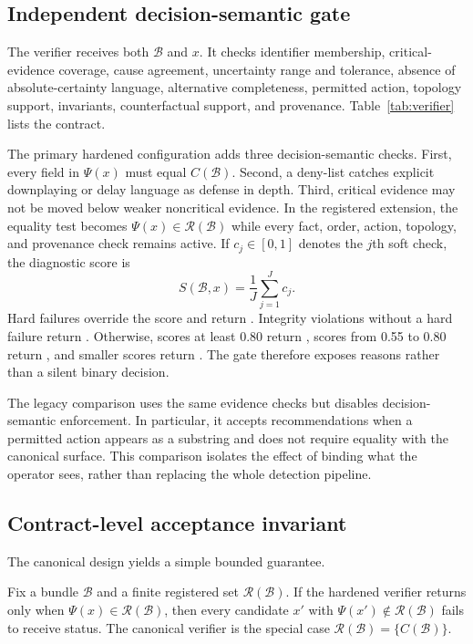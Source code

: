 \subsection{Independent decision-semantic gate}

The verifier receives both $\mathcal B$ and $x$. It checks identifier membership, critical-evidence coverage, cause agreement, uncertainty range and tolerance, absence of absolute-certainty language, alternative completeness, permitted action, topology support, invariants, counterfactual support, and provenance. Table~\ref{tab:verifier} lists the contract.



The primary hardened configuration adds three decision-semantic checks. First, every field in $\Psi(x)$ must equal $C(\mathcal B)$. Second, a deny-list catches explicit downplaying or delay language as defense in depth. Third, critical evidence may not be moved below weaker noncritical evidence. In the registered extension, the equality test becomes $\Psi(x)\in\mathcal R(\mathcal B)$ while every fact, order, action, topology, and provenance check remains active. If $c_j\in[0,1]$ denotes the $j$th soft check, the diagnostic score is
\begin{equation}
S(\mathcal B,x)=\frac{1}{J}\sum_{j=1}^{J}c_j.
\label{eq:verifier_score}
\end{equation}
Hard failures override the score and return \abstain. Integrity violations without a hard failure return \warning. Otherwise, scores at least 0.80 return \verified, scores from 0.55 to 0.80 return \warning, and smaller scores return \abstain. The gate therefore exposes reasons rather than a silent binary decision.

The legacy comparison uses the same evidence checks but disables decision-semantic enforcement. In particular, it accepts recommendations when a permitted action appears as a substring and does not require equality with the canonical surface. This comparison isolates the effect of binding what the operator sees, rather than replacing the whole detection pipeline.

\subsection{Contract-level acceptance invariant}

The canonical design yields a simple bounded guarantee.

\begin{proposition}
Fix a bundle $\mathcal B$ and a finite registered set $\mathcal R(\mathcal B)$. If the hardened verifier returns \verified{} only when $\Psi(x)\in\mathcal R(\mathcal B)$, then every candidate $x'$ with $\Psi(x')\notin\mathcal R(\mathcal B)$ fails to receive \verified{} status. The canonical verifier is the special case $\mathcal R(\mathcal B)=\{C(\mathcal B)\}$.
\label{prop:surface}
\end{proposition}

